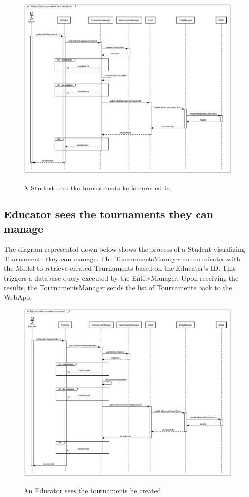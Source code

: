 \documentclass{Configuration_Files/Template}
\begin{document}
\begin{figure}[H]
\centering
\includegraphics[scale = 0.33]{Images/diagrams/sequences/GetEnrolledTournaments.png}\\
\caption{A Student sees the tournaments he is enrolled in }
\end{figure}

\subsection{Educator sees the tournaments they can manage}

The diagram represented down below shows the process of a Student visualizing Tournaments they can manage. The TournamentsManager communicates with the Model to retrieve created Tournaments based on the Educator's ID. This triggers a database query executed by the EntityManager. Upon receiving the results, the TournamentsManager sends the list of Tournaments back to the WebApp.

\begin{figure}[H]
\centering
\includegraphics[scale = 0.33]{Images/diagrams/sequences/GetCreatedTournaments.png}\\
\caption{An Educator sees the tournaments he created}
\end{figure}
\end{document}
